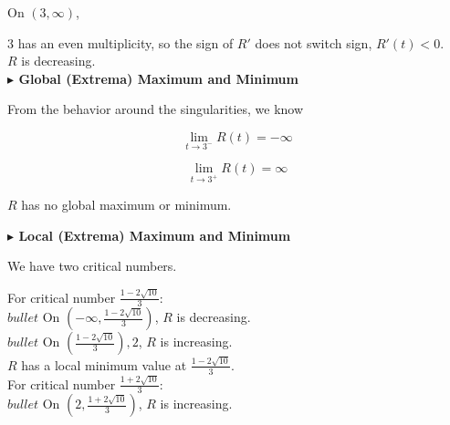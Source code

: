 \documentclass{ximera}
\begin{document}
\begin{example}
On $(3, \infty)$, 


$3$ has an even multiplicity, so the sign of $R'$ does not switch sign, $R'(t) < 0$. \\


$R$ is decreasing. \\














\textbf{\textcolor{blue!55!black}{$\blacktriangleright$ Global (Extrema) Maximum and Minimum}} 




From the behavior around the singularities, we know


\[
\lim\limits_{t \to 3^-}R(t) = -\infty
\]



\[
\lim\limits_{t \to 3^+}R(t) = \infty
\]


$R$ has no global maximum or minimum.



















\textbf{\textcolor{blue!55!black}{$\blacktriangleright$ Local (Extrema) Maximum and Minimum}} 


We have two critical numbers.


For critical number $\frac{1 - 2 \sqrt{10}}{3}$: \\


$bullet$ On $\left( -\infty, \frac{1 - 2 \sqrt{10}}{3} \right)$, $R$ is decreasing. \\


$bullet$ On $\left( \frac{1 - 2 \sqrt{10}}{3} \right), 2$, $R$ is increasing. \\


$R$ has a local minimum value at $\frac{1 - 2 \sqrt{10}}{3}$.  \\




For critical number $\frac{1 + 2 \sqrt{10}}{3}$: \\


$bullet$ On $\left( 2, \frac{1 + 2 \sqrt{10}}{3} \right)$, $R$ is increasing. \\



\end{example}
\end{document}
